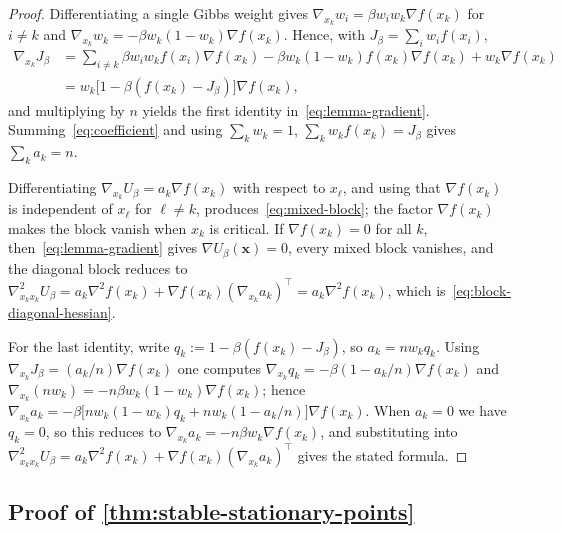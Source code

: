 \documentclass{article}
\theoremstyle{plain}
\theoremstyle{definition}
\theoremstyle{remark}
\newcommand{\xx}{\mathbf{x}}
\begin{document}
\begin{proof}
Differentiating a single Gibbs weight gives \(\nabla_{x_k}w_i=\beta w_iw_k\nabla f(x_k)\) for \(i\ne k\) and \(\nabla_{x_k}w_k=-\beta w_k(1-w_k)\nabla f(x_k)\). Hence, with \(J_\beta=\sum_i w_if(x_i)\),
\begin{align*}
    \nabla_{x_k}J_\beta & =\sum_{i\ne k}\beta w_iw_kf(x_i)\nabla f(x_k) -\beta w_k(1-w_k)f(x_k)\nabla f(x_k)+w_k\nabla f(x_k)\\
   & =w_k\bigl[1-\beta(f(x_k)-J_\beta)\bigr]\nabla f(x_k),
\end{align*}
and multiplying by \(n\) yields the first identity in~\eqref{eq:lemma-gradient}. Summing~\eqref{eq:coefficient} and using \(\sum_k w_k=1\), \(\sum_k w_kf(x_k)=J_\beta\) gives \(\sum_k a_k=n\).

Differentiating \(\nabla_{x_k}U_\beta=a_k\nabla f(x_k)\) with respect to \(x_\ell\), and using that \(\nabla f(x_k)\) is independent of \(x_\ell\) for \(\ell\ne k\), produces~\eqref{eq:mixed-block}; the factor \(\nabla f(x_k)\) makes the block vanish when \(x_k\) is critical. If \(\nabla f(x_k)=0\) for all \(k\), then~\eqref{eq:lemma-gradient} gives \(\nabla U_\beta(\xx)=0\), every mixed block vanishes, and the diagonal block reduces to \(\nabla^2_{x_kx_k}U_\beta=a_k\nabla^2 f(x_k)+\nabla f(x_k)(\nabla_{x_k}a_k)^\top =a_k\nabla^2 f(x_k)\), which is~\eqref{eq:block-diagonal-hessian}.

For the last identity, write \(q_k:=1-\beta(f(x_k)-J_\beta)\), so \(a_k=nw_kq_k\). Using \(\nabla_{x_k}J_\beta=(a_k/n)\nabla f(x_k)\) one computes \(\nabla_{x_k}q_k=-\beta(1-a_k/n)\nabla f(x_k)\) and \(\nabla_{x_k}(nw_k)=-n\beta w_k(1-w_k)\nabla f(x_k)\); hence \(\nabla_{x_k}a_k=-\beta\bigl[nw_k(1-w_k)q_k+nw_k(1-a_k/n)\bigr]\nabla f(x_k)\). When \(a_k=0\) we have \(q_k=0\), so this reduces to \(\nabla_{x_k}a_k=-n\beta w_k\nabla f(x_k)\), and substituting into \(\nabla^2_{x_kx_k}U_\beta=a_k\nabla^2 f(x_k)+\nabla f(x_k)(\nabla_{x_k}a_k)^\top\) gives the stated formula.
\end{proof}

\subsection{Proof of \texorpdfstring{\ref{thm:stable-stationary-points}}{Theorem 2.1}}
\end{document}
